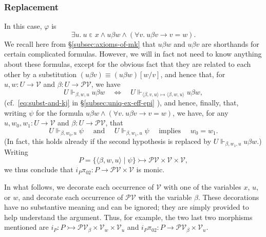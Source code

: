 \documentclass{amsart}
\newcommand\AND{\text{ and }}
\newcommand\br[1]{\langle{}#1\rangle{}}
\newcommand\cV{\mathcal{V}}
\newcommand\ein{\mathrel{\varepsilon}}
\newcommand\IMPLIES{\text{ implies }}
\renewcommand\phi{\varphi}
\newcommand\pow{\mathcal{P}}
\newcommand\set[2][]{#1\{ #2 #1\}}
\newcommand\tto{\rightarrowtail}
\newcommand\prerefpost[3]{%
  \texorpdfstring%
    {\hyperref[#2]{#1\ref*{#2}#3}}%
    {#1\ref*{#2}#3}%
}
\newcommand\sref[1]{\prerefpost{\S}{#1}{}}
\theoremstyle{definition}
\theoremstyle{remark}
\theoremstyle{plainwithref}
\begin{document}
\subsubsection{Replacement}
In this case, \( \phi \) is
\[
  \exists u.\ u \ein x \wedge u \beta w \wedge (\forall v.\ u \beta v \to v = w).
\]
We recall here from \sref{subsec:axioms-of-mk} that \( u \beta w \) and \( u \beta v \) are shorthands for certain complicated formulas.
However, we will in fact not need to know anything about these formulas, except for the obvious fact that they are related to each other by a substitution \( (u \beta v) \equiv (u \beta w)[w / v] \), and hence that, for \( u,w \colon U \to \cV \) and \( \beta \colon U \to \pow \cV \), we have
\[
  U \Vdash_{\beta, w, u} u \beta w
  \quad \iff \quad
  U \Vdash_{\br{\beta, v, u} \mapsto \br{\beta, w, u}} u \beta w,
\]
(cf.\ \eqref{eq:subst-and-kj} in \sref{subsec:uniq-ex-eff-epi}), and hence, finally, that, writing \( \psi \) for the formula \( u \beta w \wedge (\forall v.\ u \beta v \to v = w) \), we have, for any \( u,w_0,w_1 \colon U \to \cV \) and \( \beta \colon U \to \pow \cV \), that
\[
  U \Vdash_{\beta,w_0,u} \psi
  \quad\AND\quad
  U \Vdash_{\beta,w_1,u} \psi
  \quad\IMPLIES\quad
  w_0 = w_1.
\]
(In fact, this holds already if the second hypothesis is replaced by \( U \Vdash_{\beta, w_1, u} u \beta w \).)
Writing
\[
  P = \set{\br{\beta, w, u} \mid \psi} \tto \pow \cV \times \cV \times \cV,
\]
we thus conclude that \( i_P \pi_{02} \colon P \to \pow \cV \times \cV \) is monic.

In what follows, we decorate each occurrence of \( \cV \) with one of the variables \( x \), \( u \), or \( w \), and decorate each occurrence of \( \pow \cV \) with the variable \( \beta \).
These decorations have no substantive meaning and can be ignored; they are simply provided to help understand the argument.
Thus, for example, the two last two morphisms mentioned are \( i_P \colon P \tto \pow \cV_\beta \times \cV_w \times \cV_u \) and \( i_P \pi_{02} \colon P \to \pow \cV_\beta \times \cV_u \).
\end{document}
